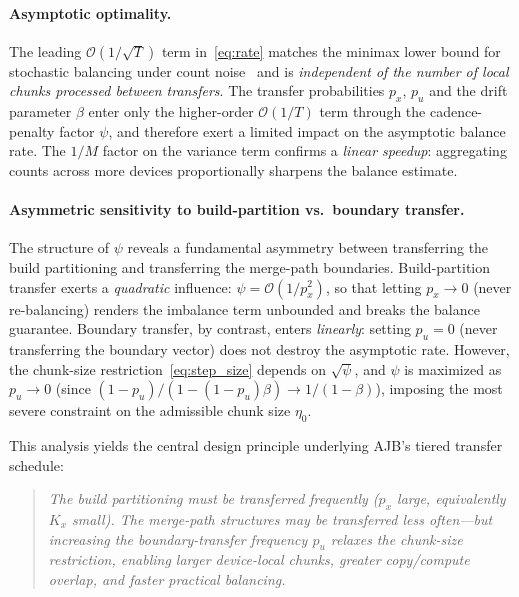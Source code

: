 \documentclass{article}
\begin{document}
\paragraph{Asymptotic optimality.}
The leading $\mathcal{O}(1/\sqrt{T})$ term in~\eqref{eq:rate} matches the
minimax lower bound for stochastic balancing under count
noise~\citep{arjevani2023lower} and is \emph{independent of the number of local
chunks processed between transfers}. The transfer probabilities $p_x$, $p_u$ and
the drift parameter $\beta$ enter only the higher-order $\mathcal{O}(1/T)$ term
through the cadence-penalty factor $\psi$, and therefore exert a limited impact
on the asymptotic balance rate. The $1/M$ factor on the variance term confirms a
\emph{linear speedup}: aggregating counts across more devices proportionally
sharpens the balance estimate.

\paragraph{Asymmetric sensitivity to build-partition vs.\ boundary transfer.}
The structure of $\psi$ reveals a fundamental asymmetry between transferring the
build partitioning and transferring the merge-path boundaries. Build-partition
transfer exerts a \emph{quadratic} influence: $\psi = \mathcal{O}(1/p_x^2)$, so
that letting $p_x \to 0$ (never re-balancing) renders the imbalance term
unbounded and breaks the balance guarantee. Boundary transfer, by contrast,
enters \emph{linearly}: setting $p_u = 0$ (never transferring the boundary
vector) does not destroy the asymptotic rate. However, the chunk-size
restriction~\eqref{eq:step_size} depends on $\sqrt{\psi}$, and $\psi$ is
maximized as $p_u \to 0$ (since $(1-p_u)/(1-(1-p_u)\beta) \to 1/(1-\beta)$),
imposing the most severe constraint on the admissible chunk size $\eta_0$.

This analysis yields the central design principle underlying AJB's tiered
transfer schedule:
\begin{quote}
\emph{The build partitioning must be transferred frequently ($p_x$ large,
equivalently $K_x$ small). The merge-path structures may be transferred less
often---but increasing the boundary-transfer frequency $p_u$ relaxes the
chunk-size restriction, enabling larger device-local chunks, greater copy/compute
overlap, and faster practical balancing.}
\end{quote}
\end{document}
